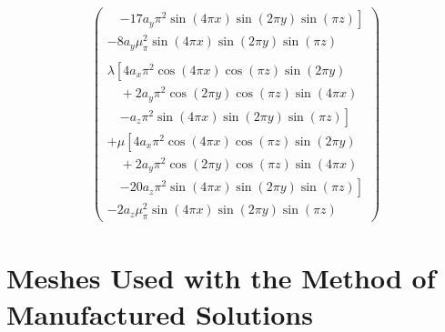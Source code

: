 \documentclass[sn-mathphys,Numbered]{sn-jnl}%
\begin{document}
\begin{appendices}
\begin{align}
\begin{pmatrix}
        \quad \left. - 17 a_y \pi^2 \sin(4\pi x) \sin(2\pi y) \sin(\pi z)
    \right] \\
    - 8 a_y \mu_ \pi^2 \sin(4\pi x) \sin(2\pi y) \sin(\pi z) \\
    \\
    \lambda
    \left[
        4 a_x \pi^2 \cos(4\pi x) \cos(\pi z) \sin(2\pi y) \right. \\
        \quad + 2 a_y \pi^2 \cos(2\pi y) \cos(\pi z) \sin(4\pi x) \\
        \quad \left. - a_z \pi^2 \sin(4\pi x) \sin(2\pi y) \sin(\pi z)
    \right] \\
    + \mu
    \left[
        4 a_x \pi^2 \cos(4\pi x) \cos(\pi z) \sin(2\pi y) \right. \\
        \quad + 2 a_y \pi^2 \cos(2\pi y) \cos(\pi z) \sin(4\pi x) \\
        \quad \left. - 20 a_z \pi^2 \sin(4\pi x) \sin(2\pi y) \sin(\pi z)
    \right] \\
    - 2 a_z \mu_ \pi^2 \sin(4\pi x) \sin(2\pi y) \sin(\pi z)
    \end{pmatrix}
\end{align}


\section{Meshes Used with the Method of Manufactured Solutions}
\label{app:meshes}





\end{appendices}


\end{document}
